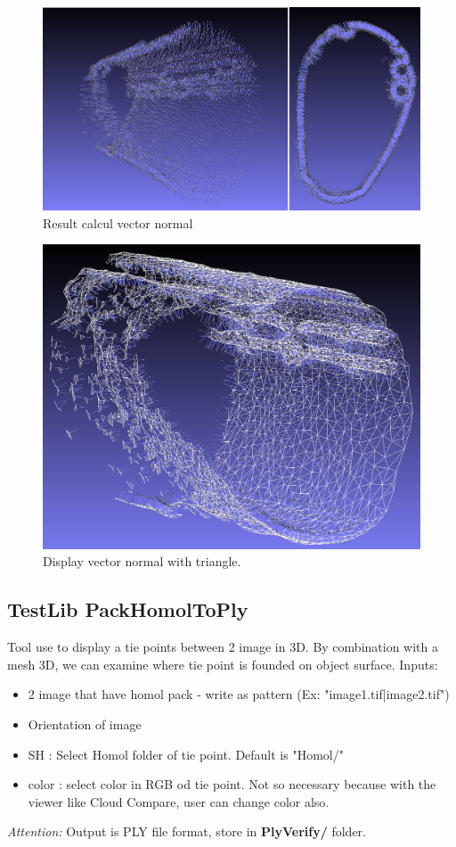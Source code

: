 \begin{figure}[H]
\centering
\includegraphics[width=15cm]{FIGS/MeshProjOnImg/VecNorMal1.png}
\caption{Result calcul vector normal}
\label{SurfCorr}
\end{figure}

\begin{figure}[H]
\centering
\includegraphics[width=15cm]{FIGS/MeshProjOnImg/VecNormalWMesh.png}
\caption{Display vector normal with triangle.}
\label{SurfCorr}
\end{figure}


\subsection{TestLib PackHomolToPly}
Tool use to display a tie points between 2 image in 3D. By combination with a mesh 3D, we can examine where tie point is founded on object surface.
Inputs:
\begin{itemize}
\item 2 image that have homol pack - write as pattern (Ex: "image1.tif|image2.tif")
\item Orientation of image
\item SH : Select Homol folder of tie point. Default is "Homol/"
\item color : select color in RGB od tie point. Not so necessary because with the viewer like Cloud Compare, user can change color also.
\end{itemize}
\textit{Attention:} Output is PLY file format, store in \textbf{PlyVerify/} folder.

